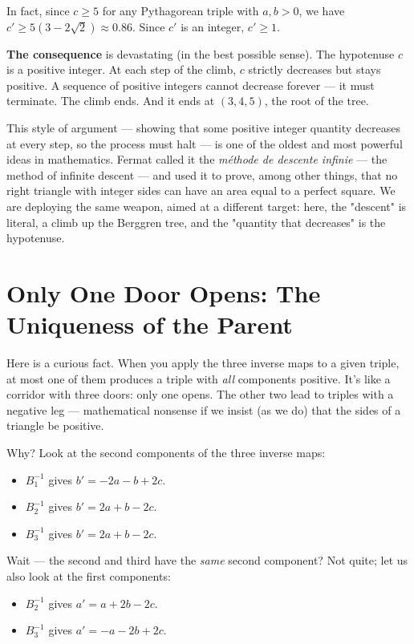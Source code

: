 \documentclass[11pt,twoside,openright]{book}
\theoremstyle{definition}
\theoremstyle{remark}
\begin{document}
In fact, since $c \geq 5$ for any Pythagorean triple with $a, b > 0$, we have $c' \geq 5(3 - 2\sqrt{2}) \approx 0.86$. Since $c'$ is an integer, $c' \geq 1$.

\textbf{The consequence} is devastating (in the best possible sense). The hypotenuse $c$ is a positive integer. At each step of the climb, $c$ strictly decreases but stays positive. A sequence of positive integers cannot decrease forever --- it must terminate. The climb ends. And it ends at $(3, 4, 5)$, the root of the tree.

This style of argument --- showing that some positive integer quantity decreases at every step, so the process must halt --- is one of the oldest and most powerful ideas in mathematics. Fermat called it the \textit{m\'ethode de descente infinie} --- the method of infinite descent --- and used it to prove, among other things, that no right triangle with integer sides can have an area equal to a perfect square. We are deploying the same weapon, aimed at a different target: here, the "descent" is literal, a climb up the Berggren tree, and the "quantity that decreases" is the hypotenuse.



\section{Only One Door Opens: The Uniqueness of the Parent}

Here is a curious fact. When you apply the three inverse maps to a given triple, at most one of them produces a triple with \textit{all} components positive. It's like a corridor with three doors: only one opens. The other two lead to triples with a negative leg --- mathematical nonsense if we insist (as we do) that the sides of a triangle be positive.

Why? Look at the second components of the three inverse maps:

\begin{itemize}
  \item $B_1^{-1}$ gives $b' = -2a - b + 2c$.
  \item $B_2^{-1}$ gives $b' = 2a + b - 2c$.
  \item $B_3^{-1}$ gives $b' = 2a + b - 2c$.
\end{itemize}

Wait --- the second and third have the \textit{same} second component? Not quite; let us also look at the first components:

\begin{itemize}
  \item $B_2^{-1}$ gives $a' = a + 2b - 2c$.
  \item $B_3^{-1}$ gives $a' = -a - 2b + 2c$.
\end{itemize}
\end{document}
